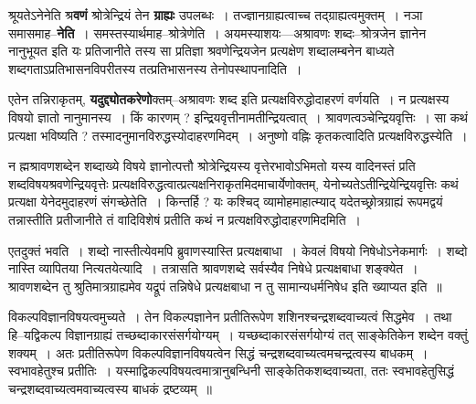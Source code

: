 \documentclass[article,12pt,a4paper]{memoir}
\begin{document}
	  \pstart श्रूयतेऽनेनेति श्र\textbf{वणं} श्रोत्रेन्द्रियं तेन \textbf{ग्राह्यः} उपलब्धः । तज्ज्ञानग्राह्यत्वाच्च तद्ग्राह्यत्वमुक्तम् । नञा समासमाह--\textbf{नेति} । समस्तस्यार्थमाह--श्रोत्रेणेति । अयमस्याशयः—अश्रावणः शब्दः--श्रोत्रजे\leavevmode{}न ज्ञानेन नानुभूयत इति यः प्रतिजानीते तस्य सा प्रतिज्ञा श्रवणेन्द्रियजेन प्रत्यक्षेण शब्दालम्बनेन बाध्यते शब्दगताऽप्रतिभासनविपरीतस्य तत्प्रतिभासनस्य तेनोपस्थापनादिति ।
	\pend
      

	  \pstart एतेन तन्निराकृतम्, \textbf{यदुद्द्योतकरेणो}क्तम्--अश्रावणः शब्द इति प्रत्यक्षविरुद्धोदाहरणं वर्णयति । न प्रत्यक्षस्य विषयो ज्ञातो नानुमानस्य । किं कारणम् ? इन्द्रियवृत्तीनामतीन्द्रियत्वात् । श्रावणत्वञ्चेन्द्रियवृत्तिः । सा कथं प्रत्यक्षा भविष्यति ? तस्मादनुमानविरुद्धस्योदाहरणमिदम् । अनुष्णो वह्निः कृतकत्वादिति प्रत्यक्षविरुद्धस्येति ।
	\pend
      

	  \pstart न ह्मश्रावणशब्देन शब्दाख्ये विषये ज्ञानोत्पत्तौ श्रोत्रेन्द्रियस्य वृत्तेरभावोऽभिमतो यस्य वादिनस्तं प्रति शब्दविषयश्रवणेन्द्रियवृत्तेः प्रत्यक्षविरुद्धत्वात्प्रत्यक्षनिराकृतमिदमाचार्येणोक्तम्, येनोच्यतेऽतीन्द्रियेन्द्रियवृत्तिः कथं प्रत्यक्षा येनेदमुदाहरणं संगच्छेतेति । किन्तर्हि ? यः कश्चिद् व्यामोहमाहात्म्याद् यदेतच्छ्रोत्रग्राह्यं रूपमद्वयं तन्नास्तीति प्रतीजानीते तं वादिविशेषं प्रतीति कथं न प्रत्यक्षविरुद्धोदाहरणमिदमिति ।
	\pend
      

	  \pstart एतदुक्तं भवति । शब्दो नास्तीत्येवमपि ब्रुवाणस्यास्ति प्रत्यक्षबाधा । केवलं विषयो निषेधोऽनेकमार्गः । शब्दो नास्ति व्यापितया नित्यतयेत्यादि । तत्रासति श्रावणशब्दे सर्वस्यैव निषेधे प्रत्यक्षबाधा शङ्क्येत । श्रावणशब्देन तु श्रुतिमात्रग्राह्यमेव यद्रूपं तन्निषेधे प्रत्यक्षबाधा न तु सामान्यधर्मनिषेध इति ख्याप्यत इति ॥
	\pend
	  \bigskip
	  \begingroup
	

	  \pstart विकल्पविज्ञानविषयत्वमुच्यते । तेन विकल्पज्ञानेन प्रतीतिरूपेण शशिनश्चन्द्रशब्दवाच्यत्वं सिद्धमेव । तथा हि--यद्विकल्प विज्ञानग्राह्यं तच्छब्दाकारसंसर्गयोग्यम् । यच्छब्दाकारसंसर्गयोग्यं तत् साङ्केतिकेन शब्देन वक्तुं शक्यम् । अतः प्रतीतिरूपेण विकल्पविज्ञानविषयत्वेन सिद्धं चन्द्रशब्दवाच्यत्वमचन्द्रत्वस्य बाधकम् । स्वभावहेतुश्च प्रतीतिः । यस्माद्विकल्पविषयत्वमात्रानुबन्धिनी साङ्केतिकशब्दवाच्यता, ततः स्वभावहेतुसिद्धं चन्द्रशब्दवाच्यत्वमवाच्यत्वस्य बाधकं द्रष्टव्यम् ॥
	\pend
      
\end{document}
